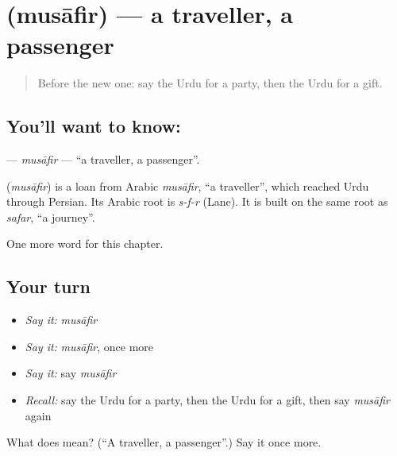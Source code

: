 \section[\texorpdfstring{\ur{مسافر} (musāfir)}{مسافر (musāfir)}]{ (musāfir) — a traveller, a passenger}

\label{lesson:UR-C202-musafir}



\begin{quote}
Before the new one: say the Urdu for a party, then the Urdu for a gift.
\end{quote}

\subsection*{You'll want to know: }
\textbf{} — \emph{musāfir} — \textquotedblleft{}a traveller, a passenger\textquotedblright{}.

\begin{cousinweb}
\textbf{} (\emph{musāfir}) is a loan from Arabic \emph{musāfir}, \textquotedblleft{}a traveller\textquotedblright{}, which reached Urdu through Persian. Its Arabic root is \emph{s-f-r} (Lane). It is built on the same root as \emph{safar}, \textquotedblleft{}a journey\textquotedblright{}.
\end{cousinweb}

\begin{grammarlens}[title={What you've built}]
One more word for this chapter.
\end{grammarlens}

\subsection*{Your turn}
\begin{itemize}
\raggedright
  \item \emph{Say it:} \emph{musāfir}
  \item \emph{Say it:} \emph{musāfir}, once more
  \item \emph{Say it:} say \emph{musāfir}
  \item \emph{Recall:} say the Urdu for a party, then the Urdu for a gift, then say \emph{musāfir} again
\end{itemize}

\begin{tcolorbox}[breakable,colback=teal!4,colframe=teal!35!black,title={Before you move on}]
What does  mean? (\textquotedblleft{}A traveller, a passenger\textquotedblright{}.) Say it once more.
\end{tcolorbox}
